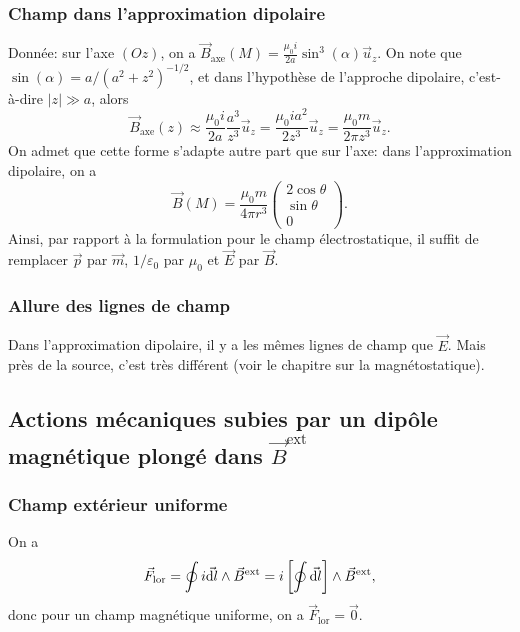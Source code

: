 \subsubsection{Champ dans l'approximation dipolaire}

Donnée: sur l'axe $(Oz)$, on a $\vec{B}_{\mathrm{axe}}(M)=\frac{\mu_0i}{2a}\sin^{3}(\alpha)\vec{u}_z$. On note que $\sin(\alpha)=a/(a^{2}+z^{2})^{-1/2}$, et dans l'hypothèse de l'approche dipolaire, c'est-à-dire $\left\lvert z\right\rvert\gg a$, alors
\begin{equation}
    \vec{B}_{\mathrm{axe}}(z)\approx\frac{\mu_0i}{2a}\frac{a^{3}}{z^{3}}\vec{u}_z=\frac{\mu_0ia^{2}}{2z^{3}}\vec{u}_z=\frac{\mu_0 m}{2\pi z^{3}}\vec{u}_z.
\end{equation}
On admet que cette forme s'adapte autre part que sur l'axe: dans l'approximation dipolaire, on a 
\begin{equation}
    \boxed{
    \vec{B}(M)=\frac{\mu_0 m}{4\pi r^{3}}\begin{pmatrix}
        2\cos\theta\\\sin\theta\\0
    \end{pmatrix}
    .}
\end{equation}
Ainsi, par rapport à la formulation pour le champ électrostatique, il suffit de remplacer $\vec{p}$ par $\vec{m}$, $1/\varepsilon_0$ par $\mu_0$ et $\vec{E}$ par $\vec{B}$.

\subsubsection{Allure des lignes de champ}
Dans l'approximation dipolaire, il y a les mêmes lignes de champ que $\vec{E}$. Mais près de la source, c'est très différent (voir le chapitre sur la magnétostatique).

\subsection{Actions mécaniques subies par un dipôle magnétique plongé dans \texorpdfstring{$\vec{B}^{\mathrm{ext}}$}{B}}
\subsubsection{Champ extérieur uniforme}
On a
\begin{equation}
    \vec{F}_{\mathrm{lor}}=\oint i\vec{\mathrm{d} l}\wedge\vec{B}^{\mathrm{ext}}=i\left[\oint\vec{\mathrm{d} l}\right]\wedge\vec{B}^{\mathrm{ext}},
\end{equation}
donc pour un champ magnétique uniforme, on a $\vec{F}_{\mathrm{lor}}=\vec{0}$.

